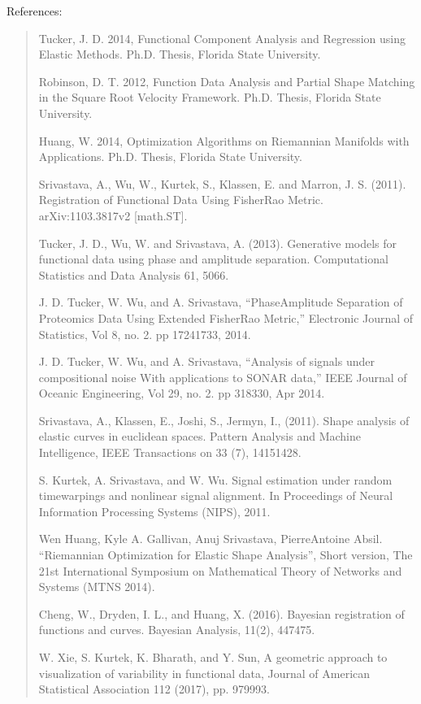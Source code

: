 \documentclass[letterpaper,10pt,english]{sphinxmanual}
\begin{document}
References:
\begin{quote}

Tucker, J. D. 2014, Functional Component Analysis and Regression using Elastic
Methods. Ph.D. Thesis, Florida State University.

Robinson, D. T. 2012, Function Data Analysis and Partial Shape Matching in the
Square Root Velocity Framework. Ph.D. Thesis, Florida State University.

Huang, W. 2014, Optimization Algorithms on Riemannian Manifolds with
Applications. Ph.D. Thesis, Florida State University.

Srivastava, A., Wu, W., Kurtek, S., Klassen, E. and Marron, J. S. (2011).
Registration of Functional Data Using Fisher\sphinxhyphen{}Rao Metric. arXiv:1103.3817v2
{[}math.ST{]}.

Tucker, J. D., Wu, W. and Srivastava, A. (2013). Generative models for
functional data using phase and amplitude separation. Computational Statistics
and Data Analysis 61, 50\sphinxhyphen{}66.

J. D. Tucker, W. Wu, and A. Srivastava, “Phase\sphinxhyphen{}Amplitude Separation of
Proteomics Data Using Extended Fisher\sphinxhyphen{}Rao Metric,” Electronic Journal of
Statistics, Vol 8, no. 2. pp 1724\sphinxhyphen{}1733, 2014.

J. D. Tucker, W. Wu, and A. Srivastava, “Analysis of signals under compositional
noise With applications to SONAR data,” IEEE Journal of Oceanic Engineering, Vol
29, no. 2. pp 318\sphinxhyphen{}330, Apr 2014.

Srivastava, A., Klassen, E., Joshi, S., Jermyn, I., (2011). Shape analysis of
elastic curves in euclidean spaces. Pattern Analysis and Machine Intelligence,
IEEE Transactions on 33 (7), 1415\sphinxhyphen{}1428.

S. Kurtek, A. Srivastava, and W. Wu. Signal estimation under random
time\sphinxhyphen{}warpings and nonlinear signal alignment. In Proceedings of Neural
Information Processing Systems (NIPS), 2011.

Wen Huang, Kyle A. Gallivan, Anuj Srivastava, Pierre\sphinxhyphen{}Antoine Absil. “Riemannian
Optimization for Elastic Shape Analysis”, Short version, The 21st International
Symposium on Mathematical Theory of Networks and Systems (MTNS 2014).

Cheng, W., Dryden, I. L., and Huang, X. (2016). Bayesian registration of functions
and curves. Bayesian Analysis, 11(2), 447\sphinxhyphen{}475.

W. Xie, S. Kurtek, K. Bharath, and Y. Sun, A geometric approach to visualization
of variability in functional data, Journal of American Statistical Association 112
(2017), pp. 979\sphinxhyphen{}993.


\end{quote}
\end{document}

